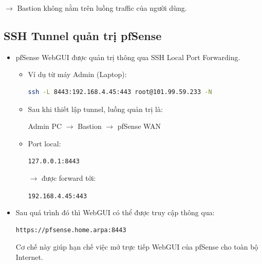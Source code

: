 \documentclass[12pt, a4paper]{article}
\begin{document}
\noindent $\rightarrow$ Bastion không nằm trên luồng traffic của người dùng.



\subsection{SSH Tunnel quản trị pfSense}

\begin{itemize}

\item pfSense WebGUI được quản trị thông qua SSH Local Port Forwarding.

\begin{itemize}
\item Ví dụ từ máy Admin (Laptop):
    
    \begin{lstlisting}[language=bash]
    ssh -L 8443:192.168.4.45:443 root@101.99.59.233 -N
    \end{lstlisting}

\item Sau khi thiết lập tunnel, luồng quản trị là:

        \begin{center}
        Admin PC
        $\rightarrow$
        Bastion
        $\rightarrow$
        pfSense WAN
        \end{center}

\item Port local:

\begin{center}
\texttt{127.0.0.1:8443}
\end{center}

$\rightarrow$ được forward tới:

\begin{center}
\texttt{192.168.4.45:443}
\end{center}

\end{itemize}

\item Sau quá trình đó thì WebGUI có thể được truy cập thông qua:

\begin{lstlisting}
https://pfsense.home.arpa:8443
\end{lstlisting}

Cơ chế này giúp hạn chế việc mở trực tiếp WebGUI của pfSense
cho toàn bộ Internet.

\end{itemize}
\end{document}

